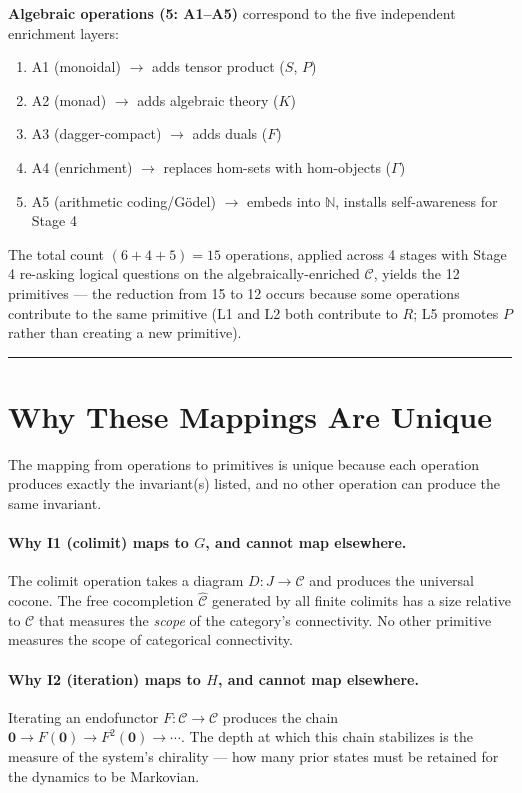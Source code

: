 \documentclass[12pt,a4paper]{article}
\begin{document}
\textbf{Algebraic operations (5: A1--A5)} correspond to the five independent enrichment layers:
\begin{enumerate}
    \item A1 (monoidal) $\to$ adds tensor product ($S$, $P$)
    \item A2 (monad) $\to$ adds algebraic theory ($K$)
    \item A3 (dagger-compact) $\to$ adds duals ($F$)
    \item A4 (enrichment) $\to$ replaces hom-sets with hom-objects ($\Gamma$)
    \item A5 (arithmetic coding/G\"odel) $\to$ embeds into $\mathbb{N}$, installs self-awareness for Stage 4
\end{enumerate}

The total count $(6 + 4 + 5) = 15$ operations, applied across 4 stages with Stage 4 re-asking logical questions on the algebraically-enriched $\mathcal{C}$, yields the 12 primitives --- the reduction from 15 to 12 occurs because some operations contribute to the same primitive (L1 and L2 both contribute to $R$; L5 promotes $P$ rather than creating a new primitive).

\begin{center}
\rule{0.5\textwidth}{0.4pt}
\end{center}

\section{Why These Mappings Are Unique}

The mapping from operations to primitives is unique because each operation produces exactly the invariant(s) listed, and no other operation can produce the same invariant. 

\paragraph{Why I1 (colimit) maps to $G$, and cannot map elsewhere.}
The colimit operation takes a diagram $D: J \to \mathcal{C}$ and produces the universal cocone. The free cocompletion $\hat{\mathcal{C}}$ generated by all finite colimits has a size relative to $\mathcal{C}$ that measures the \emph{scope} of the category's connectivity. No other primitive measures the scope of categorical connectivity.

\paragraph{Why I2 (iteration) maps to $H$, and cannot map elsewhere.}
Iterating an endofunctor $F: \mathcal{C} \to \mathcal{C}$ produces the chain $\mathbf{0} \to F(\mathbf{0}) \to F^2(\mathbf{0}) \to \cdots$. The depth at which this chain stabilizes is the measure of the system's chirality --- how many prior states must be retained for the dynamics to be Markovian.
\end{document}
